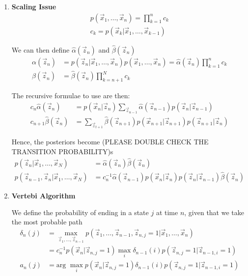 \documentclass[12pt,twoside]{article}
\begin{document}
\begin{enumerate}
\item \textbf{Scaling Issue}
\begin{align*}
	p(\vec{x}_1,\ldots , \vec{x}_n) = \prod_{k=1}^n c_k\\
	c_k = p(\vec{x}_k \vert \vec{x}_1, \ldots, \vec{x}_{k-1})
\end{align*}

We can then define $\hat{\alpha}(\vec{z}_n)$ and $\hat{\beta}(\vec{z}_n)$
\begin{align*}
	\alpha(\vec{z}_n) & = p(\vec{z}_n \vert \vec{x}_1, \ldots, \vec{x}_n) p(\vec{x}_1,\ldots, \vec{x}_n) = \hat{\alpha}(\vec{z}_n) \prod_{k=1}^n c_k\\
	\beta (\vec{z}_n) & = \hat{\beta}(\vec{z}_n) \prod_{k=n+1}^N c_k
\end{align*}

The recursive formulae to use are then:
\begin{align*}
c_n\hat{\alpha}(\vec{z}_n) &= p(\vec{x}_n\vert \vec{z}_n) \sum_{\vec{z}_{n-1}}\hat{\alpha}(\vec{z}_{n-1})p(\vec{z}_n \vert \vec{z}_{n-1})\\
c_{n+1}\hat{\beta}(\vec{z}_n) & = \sum_{\vec{z}_{t+1}} \hat{\beta}(\vec{z}_{n+1})p(\vec{x}_{n+1}\vert \vec{z}_{n+1}) p(\vec{z}_{n+1}\vert \vec{z}_n)
\end{align*}

Hence, the posteriors become (PLEASE DOUBLE CHECK THE TRANSITION PROBABILITY)s
\begin{align*}
	p(\vec{z}_n \vert \vec{x}_1, \ldots, \vec{x}_N) &= \hat{\alpha}(\vec{z}_n)\hat{\beta}(\vec{z}_n)\\
	p(\vec{z}_{n-1}, \vec{z}_n \vert \vec{x}_1, \ldots, \vec{x}_N) &= c_n^{-1}\hat{\alpha}(\vec{z}_{n-1})p(\vec{x}_n\vert \vec{z}_n)p(\vec{z}_n\vert \vec{z}_{n-1})\hat{\beta}(\vec{z}_{n})
\end{align*}

\item \textbf{Vertebi Algorithm}

We define the probability of ending in a state $j$ at time $n$, given that we take the most probable path
\begin{align*}
	\delta_n(j) 
	&= \max_{\vec{z}_1, \ldots, \vec{z}_{n-1}} p(\vec{z}_1, \ldots, \vec{z}_{n-1}, \vec{z}_{n,j}=1\vert \vec{x}_1,\ldots, \vec{x}_n)\\
	&= c_n^{-1} p(\vec{x}_n \vert \vec{z}_{n, j}=1)\max_{i} \delta_{n-1}(i) p(\vec{z}_{n,j}=1 \vert \vec{z}_{n-1,i}=1) \\
	a_n(j)& = \text{arg } \max_i p(\vec{x}_n\vert \vec{z}_{n,j} =1) \delta_{n-1}(i)p(\vec{z}_{n,j}=1 \vert \vec{z}_{n-1,i}=1)
\end{align*}


\end{enumerate}
\end{document}
